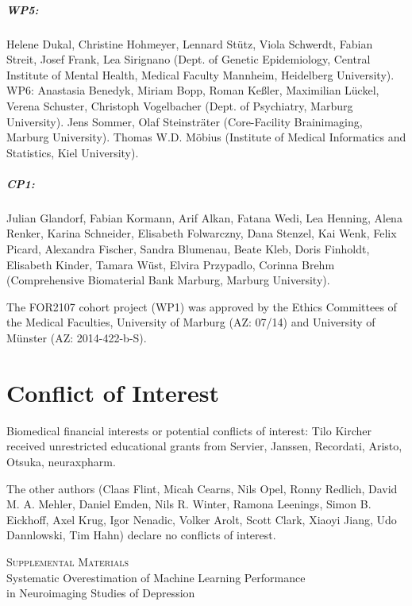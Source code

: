 \documentclass{article}
\begin{document}
    \subparagraph{WP5:} Helene Dukal, Christine Hohmeyer, Lennard Stütz, Viola Schwerdt, Fabian Streit, Josef Frank, Lea Sirignano (Dept. of Genetic Epidemiology, Central Institute of Mental Health, Medical Faculty Mannheim, Heidelberg University).
    WP6: Anastasia Benedyk, Miriam Bopp, Roman Keßler, Maximilian Lückel, Verena Schuster, Christoph Vogelbacher (Dept. of Psychiatry, Marburg University). Jens Sommer, Olaf Steinsträter (Core-Facility Brainimaging, Marburg University). Thomas W.D. Möbius (Institute of Medical Informatics and Statistics, Kiel University).

    \subparagraph{CP1:} Julian Glandorf, Fabian Kormann, Arif Alkan, Fatana Wedi, Lea Henning, Alena Renker, Karina Schneider, Elisabeth Folwarczny, Dana Stenzel, Kai Wenk, Felix Picard, Alexandra Fischer, Sandra Blumenau, Beate Kleb, Doris Finholdt, Elisabeth Kinder, Tamara Wüst, Elvira Przypadlo, Corinna Brehm (Comprehensive Biomaterial Bank Marburg, Marburg University).

    The FOR2107 cohort project (WP1) was approved by the Ethics Committees of the Medical Faculties, University of Marburg (AZ: 07/14) and University of Münster (AZ: 2014-422-b-S).

    \section*{Conflict of Interest}
    Biomedical financial interests or potential conflicts of interest: Tilo Kircher received unrestricted educational grants from Servier, Janssen, Recordati, Aristo, Otsuka, neuraxpharm.

    The other authors (Claas Flint, Micah Cearns, Nils Opel, Ronny Redlich, David M. A. Mehler, Daniel Emden, Nils R. Winter, Ramona Leenings, Simon B. Eickhoff, Axel Krug, Igor Nenadic, Volker Arolt, Scott Clark, Xiaoyi Jiang, Udo Dannlowski, Tim Hahn) declare no conflicts of interest.


    
    


    \newpage
    \appendix


    \begin{center}
        \LARGE{\textsc{Supplemental Materials}} \\ \Large{Systematic Overestimation of Machine Learning Performance \\ in Neuroimaging Studies of Depression}
    \end{center}

    \setcounter{equation}{1}
    \setcounter{figure}{0}
    \setcounter{table}{0}
    \setcounter{page}{1}
    \makeatletter
    \renewcommand\thefigure{\thesection.\arabic{figure}}
    \renewcommand\thetable{\thesection.\arabic{table}}

    
\end{document}
